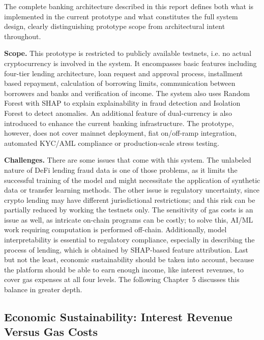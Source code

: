 \documentclass[12pt,a4paper]{report}
\begin{document}
\noindent The complete banking architecture described in this report defines both what is implemented in the current prototype and what constitutes the full system design, clearly distinguishing prototype scope from architectural intent throughout.

\textbf{Scope.} This prototype is restricted to publicly available testnets, i.e. no actual cryptocurrency is involved in the system. It encompasses basic features including four-tier lending architecture, loan request and approval process, installment based repayment, calculation of borrowing limits, communication between borrowers and banks and verification of income. The system also uses Random Forest with SHAP to explain explainability in fraud detection and Isolation Forest to detect anomalies. An additional feature of dual-currency is also introduced to enhance the current banking infrastructure. The prototype, however, does not cover mainnet deployment, fiat on/off-ramp integration, automated KYC/AML compliance or production-scale stress testing.

\textbf{Challenges.} There are some issues that come with this system. The unlabeled nature of DeFi lending fraud data is one of those problems, as it limits the successful training of the model and might necessitate the application of synthetic data or transfer learning methods. The other issue is regulatory uncertainty, since crypto lending may have different jurisdictional restrictions; and this risk can be partially reduced by working the testnets only. The sensitivity of gas costs is an issue as well, as intricate on-chain programs can be costly; to solve this, AI/ML work requiring computation is performed off-chain. Additionally, model interpretability is essential to regulatory compliance, especially in describing the process of lending, which is obtained by SHAP-based feature attribution. Last but not the least, economic sustainability should be taken into account, because the platform should be able to earn enough income, like interest revenues, to cover gas expenses at all four levels. The following Chapter~5 discusses this balance in greater depth.

\subsection{Economic Sustainability: Interest Revenue Versus Gas Costs}
\end{document}
